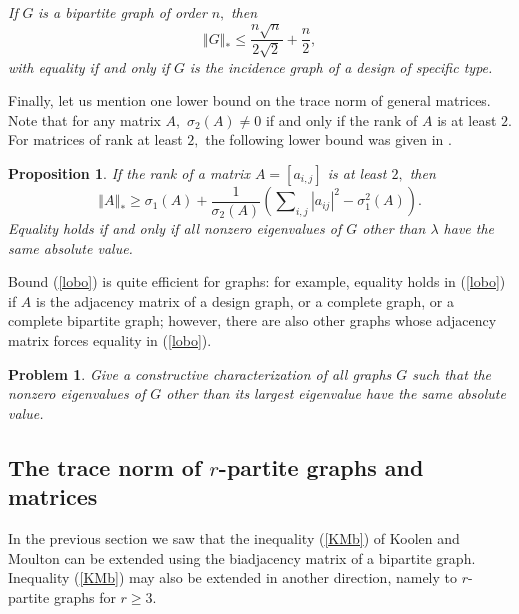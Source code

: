 \documentclass[12pt]{article}%
\newtheorem{problem}[theorem]{Problem}
\newtheorem{proposition}[theorem]{Proposition}
\begin{document}
\emph{If }$G$\emph{ is a bipartite graph of order }$n,$\emph{ then}%
\begin{equation}
\left\Vert G\right\Vert _{\ast}\leq\frac{n\sqrt{n}}{2\sqrt{2}}+\frac{n}{2},
\label{KMb}%
\end{equation}
\emph{ with equality if and only if }$G$\emph{ is the incidence graph of a
design of specific type.}\medskip

Finally, let us mention one lower bound on the trace norm of general matrices.
Note that for any matrix $A,$ $\sigma_{2}\left(  A\right)  \neq0$ if and only
if the rank of $A$ is at least $2.$ For matrices of rank at least $2,$ the
following lower bound was given in \cite{Nik07i}.

\begin{proposition}
\label{prol}If the rank of a matrix $A=\left[  a_{i,j}\right]  $ is at least
$2,$ then%
\begin{equation}
\left\Vert A\right\Vert _{\ast}\geq\sigma_{1}\left(  A\right)  +\frac
{1}{\sigma_{2}\left(  A\right)  }\left(  \sum\nolimits_{i,j}\left\vert
a_{ij}\right\vert ^{2}-\sigma_{1}^{2}\left(  A\right)  \right)  . \label{lobo}%
\end{equation}
Equality holds if and only if all nonzero eigenvalues of $G$ other than
$\lambda$ have the same absolute value.
\end{proposition}

Bound (\ref{lobo}) is quite efficient for graphs: for example, equality holds
in (\ref{lobo}) if $A$ is the adjacency matrix of a design graph, or a
complete graph, or a complete bipartite graph; however, there are also other
graphs whose adjacency matrix forces equality in (\ref{lobo}).

\begin{problem}
Give a constructive characterization of all graphs $G$ such that the nonzero
eigenvalues of $G$ other than its largest eigenvalue have the same absolute value.
\end{problem}

\subsection{\label{secMTN}The trace norm of $r$-partite graphs and matrices}

In the previous section we saw that the inequality (\ref{KMb}) of Koolen and
Moulton can be extended using the biadjacency matrix of a bipartite graph.
Inequality (\ref{KMb}) may also be extended in another direction, namely to
$r$-partite graphs for $r\geq3$.
\end{document}
